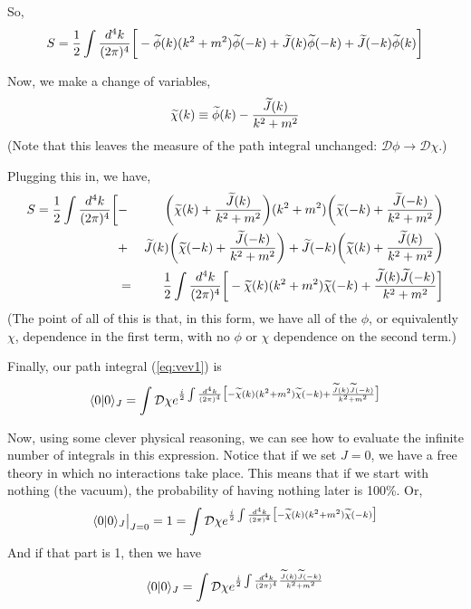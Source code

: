 \documentclass[12pt,epsf]{article}
\def\nolabel{\nonumber }
\def\nolabel{\nonumber }
\begin{document}
So, 
\begin{eqnarray}
S = {1\over 2} \int {d^4k \over (2\pi)^4} \bigg[-\widetilde{\phi}(k)
(k^2 + m^2)\widetilde{\phi}(-k)+\widetilde{J}(k)\widetilde{\phi}(-k) +
\widetilde{J}(-k)\widetilde{\phi}(k)\bigg] \nolabel
\end{eqnarray}

Now, we make a change of variables,
\begin{eqnarray}
\widetilde{\chi}(k) \equiv \widetilde{\phi}(k) - {\widetilde{J}(k)
\over k^2 + m^2}\nolabel
\end{eqnarray}
(Note that this leaves the measure of the path integral unchanged:
$\mathcal{D}\phi \rightarrow \mathcal{D}\chi$.)  

Plugging this in, we have, 
\begin{eqnarray}
S = {1\over 2} \int {d^4k \over (2\pi)^4} \bigg[ &-&
\bigg(\widetilde{\chi}(k) + {\widetilde{J}(k) \over
k^2+m^2}\bigg)(k^2+m^2)\bigg(\widetilde{\chi}(-k) + {\widetilde{J}(-k)
\over k^2+m^2}\bigg) \nolabel \\
&+& \widetilde{J}(k)\bigg(\widetilde{\chi}(-k) + {\widetilde{J}(-k)
\over k^2+m^2}\bigg) + \widetilde{J}(-k) \bigg(\widetilde{\chi}(k) +
{\widetilde{J}(k) \over k^2+m^2} \bigg) \nolabel \\
&=& {1\over 2} \int {d^4k \over (2\pi)^4}
\bigg[-\widetilde{\chi}(k)(k^2 +
m^2)\widetilde{\chi}(-k)+{\widetilde{J}(k)\widetilde{J}(-k) \over
k^2+m^2}\bigg]	\nolabel
\end{eqnarray}
(The point of all of this is that, in this form, we have all of the
$\phi$, or equivalently $\chi$, dependence in the first term, with no
$\phi$ or $\chi$ dependence on the second term.)  

Finally, our path integral (\ref{eq:vev1}) is
\begin{eqnarray}
\langle 0 | 0 \rangle_J = \int \mathcal{D}\chi e^{{i\over 2} \int {d^4k
\over  (2\pi)^4}\big[-\widetilde{\chi}(k)(k^2+m^2)\widetilde{\chi}(-k)
+ {\widetilde{J}(k) \widetilde{J}(-k) \over k^2+m^2 } \big]}\nolabel
\end{eqnarray}

Now, using some clever physical reasoning, we can see how to evaluate
the infinite number of integrals in this expression.  Notice that if we
set $J=0$, we have a free theory in which no interactions take place. 
This means that if we start with nothing (the vacuum), the probability
of having nothing later is 100\%.  Or,
\begin{eqnarray}
\langle 0 | 0 \rangle_J \big|_{J=0} = 1 =   \int \mathcal{D}\chi
e^{{i\over 2} \int {d^4k \over (2\pi)^4}
\big[-\widetilde{\chi}(k)(k^2+m^2)\widetilde{\chi}(-k)\big]}\nolabel
\end{eqnarray}
And if that part is 1, then we have 
\begin{eqnarray}
\langle 0 | 0 \rangle_J = \int \mathcal{D}\chi e^{{i \over 2} \int
{d^4k \over (2\pi)^4}{\widetilde{J}(k) \widetilde{J}(-k) \over
k^2+m^2}}\nolabel
\end{eqnarray}
\end{document}
